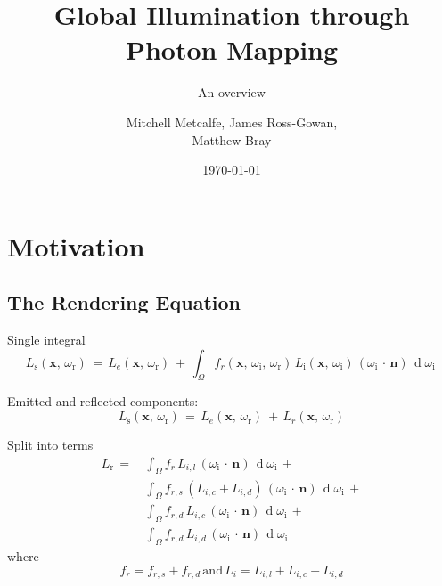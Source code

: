 \documentclass{beamer}
\title[COMP3320 Background Presentation]{Global Illumination through Photon Mapping}
\subtitle{An overview}
\author{Mitchell Metcalfe, James Ross-Gowan,\\ Matthew Bray}
\institute{University of Newcastle}
\date{\today}
\begin{document}
  \maketitle
  
  \section{Motivation}

    \subsection{The Rendering Equation}

      \begin{frame}{Single integral}
        \[
          L_{\text{s}}(\mathbf x,\, \omega_{\text{r}}) \,=\,%
            L_e(\mathbf x,\, \omega_{\text{r}}) \ +\, %
            \int_\Omega %
              f_r(\mathbf x,\, \omega_{\text{i}},\, \omega_{\text{r}})\, %
                L_{\text{i}}(\mathbf x,\, \omega_{\text{i}})\, %
              (\omega_{\text{i}}\,\cdot\,\mathbf n)\,
            \operatorname d \omega_{\text{i}}
        \, \]

        \pause
        Emitted and reflected components:
        \[
          L_{\text{s}}(\mathbf x,\, \omega_{\text{r}}) \,=\,%
            L_e(\mathbf x,\, \omega_{\text{r}}) \ +\, %
            L_r(\mathbf x,\, \omega_{\text{r}})
        \]
      \end{frame}

      \begin{frame}{Split into terms}
        \begin{equation*}
        \begin{split}
          L_{\text{r}} \,=\,%
            &\int_\Omega %
              f_r\, %
                L_{i,l}\, %
              (\omega_{\text{i}}\,\cdot\,\mathbf n)\,
            \operatorname d \omega_{\text{i}}%
            \, +\\%
            &\int_\Omega %
              f_{r, s}\, %
                (L_{i,c} + L_{i,d})\, %
              (\omega_{\text{i}}\,\cdot\,\mathbf n)\,
            \operatorname d \omega_{\text{i}}
            \, +\\%
            &\int_\Omega %
              f_{r, d}\, %
                L_{i,c}\, %
              (\omega_{\text{i}}\,\cdot\,\mathbf n)\,
            \operatorname d \omega_{\text{i}}
            \, +\\%
            &\int_\Omega %
              f_{r, d}\, %
                L_{i,d}\, %
              (\omega_{\text{i}}\,\cdot\,\mathbf n)\,
            \operatorname d \omega_{\text{i}}
        \, \end{split}
        \end{equation*}
        where
        \[
          f_r = f_{r, s} + f_{r, d}%
          \, \text{and} \,%
          L_i = L_{i,l} + L_{i,c} + L_{i,d}
        \]
      \end{frame}
\end{document}

